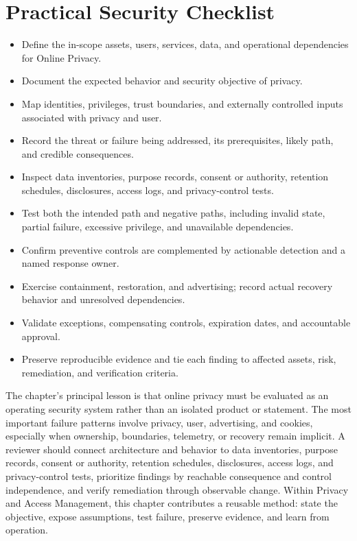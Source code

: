 \documentclass[11pt]{article}
\begin{document}
\section*{Practical Security Checklist}
\begin{itemize}[label=$\square$]
\item Define the in-scope assets, users, services, data, and operational dependencies for Online Privacy.
\item Document the expected behavior and security objective of privacy.
\item Map identities, privileges, trust boundaries, and externally controlled inputs associated with privacy and user.
\item Record the threat or failure being addressed, its prerequisites, likely path, and credible consequences.
\item Inspect data inventories, purpose records, consent or authority, retention schedules, disclosures, access logs, and privacy-control tests.
\item Test both the intended path and negative paths, including invalid state, partial failure, excessive privilege, and unavailable dependencies.
\item Confirm preventive controls are complemented by actionable detection and a named response owner.
\item Exercise containment, restoration, and advertising; record actual recovery behavior and unresolved dependencies.
\item Validate exceptions, compensating controls, expiration dates, and accountable approval.
\item Preserve reproducible evidence and tie each finding to affected assets, risk, remediation, and verification criteria.
\end{itemize}
\begin{synthesisbox}
The chapter's principal lesson is that online privacy must be evaluated as an operating security system rather than an isolated product or statement. The most important failure patterns involve privacy, user, advertising, and cookies, especially when ownership, boundaries, telemetry, or recovery remain implicit. A reviewer should connect architecture and behavior to data inventories, purpose records, consent or authority, retention schedules, disclosures, access logs, and privacy-control tests, prioritize findings by reachable consequence and control independence, and verify remediation through observable change. Within Privacy and Access Management, this chapter contributes a reusable method: state the objective, expose assumptions, test failure, preserve evidence, and learn from operation.
\end{synthesisbox}
\end{document}
